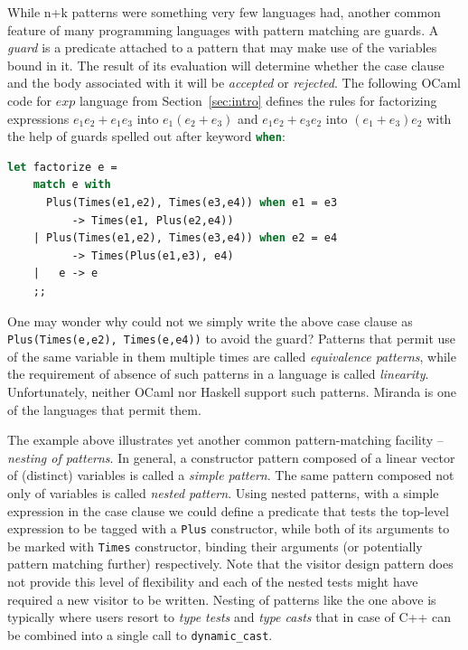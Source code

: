 \documentclass[preprint]{sigplanconf}
\makeatletter
\DeclareRobustCommand{\code}[1]{{\lstinline[breaklines=false,escapechar=@]{#1}}}
\DeclareRobustCommand{\codeocaml}[1]{{\lstinline[breaklines=false,language=Caml]{#1}}}
\makeatother
\begin{document}
While n+k patterns were something very few languages had, another common feature of 
many programming languages with pattern matching are guards. A \emph{guard} 
is a predicate attached to a pattern that may make use of the variables bound in 
it. The result of its evaluation will determine whether the case clause and the 
body associated with it will be \emph{accepted} or \emph{rejected}. The 
following OCaml code for $exp$ language from Section~\ref{sec:intro} defines the 
rules for factorizing expressions $e_1e_2+e_1e_3$ into $e_1(e_2+e_3)$ and 
$e_1e_2+e_3e_2$ into $(e_1+e_3)e_2$ with the help of guards spelled out after 
keyword \codeocaml{when}:

\begin{lstlisting}[language=Caml,keepspaces,columns=flexible]
let factorize e =
    match e with
      Plus(Times(e1,e2), Times(e3,e4)) when e1 = e3 
          -> Times(e1, Plus(e2,e4))
    | Plus(Times(e1,e2), Times(e3,e4)) when e2 = e4 
          -> Times(Plus(e1,e3), e4)
    |   e -> e
    ;;
\end{lstlisting}

One may wonder why could not we simply write the above case clause as 
\codeocaml{Plus(Times(e,e2), Times(e,e4))} to avoid the guard? Patterns that 
permit use of the same variable in them multiple times are called 
\emph{equivalence patterns}, while the requirement of absence of such patterns 
in a language is called \emph{linearity}. Unfortunately, neither OCaml nor 
Haskell support such patterns. Miranda\cite{Miranda85} is one of the languages 
that permit them. 

The example above illustrates yet another common pattern-matching facility -- 
\emph{nesting of patterns}. In general, a constructor pattern composed of a 
linear vector of (distinct) variables is called a \emph{simple pattern}. The 
same pattern composed not only of variables is called \emph{nested pattern}.
Using nested patterns, with a simple expression in the case clause we could
define a predicate that tests the top-level expression to be tagged with a
\codeocaml{Plus} constructor, while both of its arguments to be marked with 
\codeocaml{Times} constructor, binding their arguments (or potentially pattern 
matching further) respectively. Note that the visitor design pattern does not 
provide this level of flexibility and each of the nested tests might have 
required a new visitor to be written. Nesting of patterns like the one above is 
typically where users resort to \emph{type tests} and \emph{type casts} that in 
case of C++ can be combined into a single call to \code{dynamic_cast}.
\end{document}
